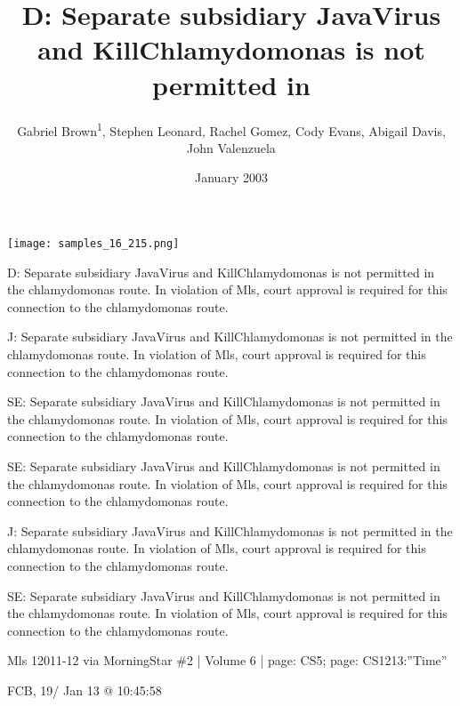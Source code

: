 \documentclass{article}
\title{D: Separate subsidiary JavaVirus and KillChlamydomonas is not permitted in}
\author{Gabriel Brown\textsuperscript{1},  Stephen Leonard,  Rachel Gomez,  Cody Evans,  Abigail Davis,  John Valenzuela}
\affil{\textsuperscript{1}Blood Transfusion Centre of Slovenia}
\date{January 2003}
\begin{document}
\maketitle

\begin{center}
\begin{minipage}{0.75\linewidth}
\texttt{[image: samples\_16\_215.png]}
\end{minipage}
\end{center}

D: Separate subsidiary JavaVirus and KillChlamydomonas is not permitted in the chlamydomonas route. In violation of Mls, court approval is required for this connection to the chlamydomonas route.

J: Separate subsidiary JavaVirus and KillChlamydomonas is not permitted in the chlamydomonas route. In violation of Mls, court approval is required for this connection to the chlamydomonas route.

SE: Separate subsidiary JavaVirus and KillChlamydomonas is not permitted in the chlamydomonas route. In violation of Mls, court approval is required for this connection to the chlamydomonas route.

SE: Separate subsidiary JavaVirus and KillChlamydomonas is not permitted in the chlamydomonas route. In violation of Mls, court approval is required for this connection to the chlamydomonas route.

J: Separate subsidiary JavaVirus and KillChlamydomonas is not permitted in the chlamydomonas route. In violation of Mls, court approval is required for this connection to the chlamydomonas route.

SE: Separate subsidiary JavaVirus and KillChlamydomonas is not permitted in the chlamydomonas route. In violation of Mls, court approval is required for this connection to the chlamydomonas route.

Mls 12011-12 via MorningStar \#2 | Volume 6 | page: CS5; page: CS1213:”Time”

FCB, 19/ Jan 13 @ 10:45:58
\end{document}
